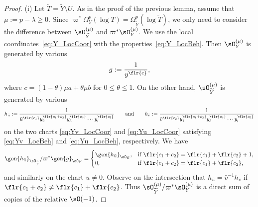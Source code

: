 \begin{proof}(i) Let $\widetilde{T} = \widetilde{Y}\setminus U$. As in the proof of the previous lemma, assume that $\mu:= p-\lambda \geq 0$. Since $\varpi^*\Omega_Y^p(\log T) = \Omega_{\widetilde{Y}}^p(\log \widetilde{T})$,
we only need to consider the difference between $\sO_{\widetilde{Y}}^{(\mu)}$ and $\varpi^*\sO_Y^{(\mu)}$. We use the local coordinates~\eqref{eq:Y_LocCoor} with the properties~\eqref{eq:Y_LocBeh}. Then $\sO_Y^{(\mu)}$ is generated by various
\begin{gather}\label{eq:g_Gen}g := \frac{1}{y^{\flr{c}}},\end{gather}
where $c = (1-\theta)\mu a + \theta\mu b$ for $0\leq\theta\leq 1$. On the other hand, $\sO_{\widetilde{Y}}^{(\mu)}$ is generated by various
\begin{gather*} h_{\bar{u}} := \frac{1}{\bar{u}^{\flr{c_1}}y_2^{\flr{c_1+c_2}}y_3^{\flr{c_3}}\cdots y_l^{\flr{c_l}}} \qquad\text{and}\qquad h_{\bar{v}} :=	\frac{1}{\bar{v}^{\flr{c_2}}y_1^{\flr{c_1+c_2}}y_3^{\flr{c_3}}
	\cdots y_l^{\flr{c_l}}} \end{gather*}
on the two charts \eqref{eq:Yv_LocCoor} and \eqref{eq:Yu_LocCoor} satisfying \eqref{eq:Yv_LocBeh} and \eqref{eq:Yu_LocBeh}, respectively. We have
\begin{gather*} \gen{h_{\bar{u}}}_{\sO_{\widetilde{Y}}}/\varpi^*\gen{g}_{\sO_Y} = \begin{cases}
\gen{h_{\bar{u}}}_{\sO_E}, & 	\text{if $\flr{c_1+c_2} = \flr{c_1} + \flr{c_2} + 1$}, \\
0, & \text{if $\flr{c_1+c_2} = \flr{c_1} + \flr{c_2}$},
\end{cases} \end{gather*}
and similarly on the chart $u\neq 0$. Observe on the intersection that $h_{\bar{u}} = \bar{v}^{-1}h_{\bar{v}}$ if $\flr{c_1+c_2} \neq \flr{c_1} + \flr{c_2}$. Thus $\sO_{\widetilde{Y}}^{(\mu)}/\varpi^*\sO_{Y}^{(\mu)}$
is a direct sum of copies of the relative $\sO(-1)$.


\end{proof}
